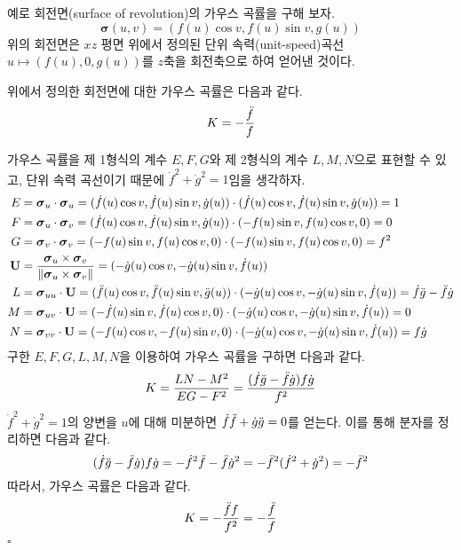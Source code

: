 \documentclass[10pt,a4paper]{article}
\renewenvironment{proof}{{\sffamily\bfseries Proof:~}}{\hfill$\square$}
\begin{document}
예로 회전면(surface of revolution)의 가우스 곡률을 구해 보자.
\[\boldsymbol{\sigma}(u,v) = (f(u)\cos v, f(u)\sin v, g(u))\]
위의 회전면은 $xz$ 평면 위에서 정의된 단위 속력(unit-speed)곡선 $u \mapsto (f(u), 0, g(u))$를 $z$축을 회전축으로 하여 얻어낸 것이다.
\begin{tcolorbox}[title = 회전면의 가우스 곡률]
위에서 정의한 회전면에 대한 가우스 곡률은 다음과 같다.
\[K = -\frac{\Ddot{f}}{f}\]
\end{tcolorbox}
\begin{proof}
가우스 곡률을 제 1형식의 계수 $E, F, G$와 제 2형식의 계수 $L, M, N$으로 표현할 수 있고, 단위 속력 곡선이기 때문에 $\dot{f}^{2} + \dot{g}^{2} = 1$임을 생각하자.
\begin{align*}
E &= \boldsymbol{\sigma}_{u}\cdot\boldsymbol{\sigma}_{u} = (\dot{f}(u)\cos v, \dot{f}(u)\sin v, \dot{g}(u))\cdot (\dot{f}(u)\cos v, \dot{f}(u)\sin v, \dot{g}(u)) = 1 \\
F &= \boldsymbol{\sigma}_{u}\cdot\boldsymbol{\sigma}_{v} = (\dot{f}(u)\cos v, \dot{f}(u)\sin v, \dot{g}(u))\cdot (-f(u)\sin v, f(u)\cos v, 0) = 0 \\
G &= \boldsymbol{\sigma}_{v}\cdot\boldsymbol{\sigma}_{v} = (-f(u)\sin v, f(u)\cos v, 0)\cdot (-f(u)\sin v, f(u)\cos v, 0) = f^{2} \\
\mathbf{U} &= \frac{\boldsymbol{\sigma}_{u} \times \boldsymbol{\sigma}_{v}}{\lVert \boldsymbol{\sigma}_{u} \times \boldsymbol{\sigma}_{v} \rVert} = (-\dot{g}(u)\cos v, -\dot{g}(u)\sin v, \dot{f}(u)) \\
L &= \boldsymbol{\sigma}_{uu} \cdot \mathbf{U} 
= (\Ddot{f}(u)\cos v, \Ddot{f}(u)\sin v, \Ddot{g}(u)) \cdot (-\dot{g}(u)\cos v, -\dot{g}(u)\sin v, \dot{f}(u)) 
= \dot{f}\Ddot{g} - \Ddot{f}\dot{g} \\
M &= \boldsymbol{\sigma}_{uv} \cdot \mathbf{U}  
= (-\dot{f}(u)\sin v, \dot{f}(u)\cos v, 0) \cdot (-\dot{g}(u)\cos v, -\dot{g}(u)\sin v, \dot{f}(u)) 
= 0 \\
N &= \boldsymbol{\sigma}_{vv} \cdot \mathbf{U} 
= (-f(u)\cos v, -f(u)\sin v, 0) \cdot (-\dot{g}(u)\cos v, -\dot{g}(u)\sin v, \dot{f}(u)) 
= f\dot{g}
\end{align*}
구한 $E, F, G, L, M, N$을 이용하여 가우스 곡률을 구하면 다음과 같다.
$$K = \frac{LN - M^{2}}{EG - F^{2}} = \frac{(\dot{f}\Ddot{g} - \Ddot{f}\dot{g})f\dot{g}}{f^{2}}$$
$\dot{f}^{2} + \dot{g}^{2} = 1$의 양변을 $u$에 대해 미분하면 $\dot{f}\Ddot{f} + \dot{g}\Ddot{g} = 0$를 얻는다. 이를 통해 분자를 정리하면 다음과 같다.
\[(\dot{f}\Ddot{g} - \Ddot{f}\dot{g})f\dot{g} = -\dot{f}^{2}\Ddot{f}-\Ddot{f}\dot{g}^{2} = -\Ddot{f}^{2}(\dot{f}^{2} + \dot{g}^{2}) = -\Ddot{f}^{2}\]
따라서, 가우스 곡률은 다음과 같다.
\[K = -\frac{\Ddot{f}f}{f^{2}} = -\frac{\Ddot{f}}{f}\]
\end{proof}
\end{document}
